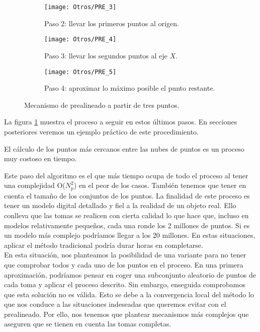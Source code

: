\begin{figure}[h!]
	\begin{subfigure}{0.5\textwidth}
		\centering
		\texttt{[image: Otros/PRE\_3]}
		\caption{Paso 2: llevar los primeros puntos al origen.}
	\end{subfigure}
	\begin{subfigure}{0.5\textwidth}
		\centering
		\texttt{[image: Otros/PRE\_4]}
		\caption{Paso 3: llevar los segundos puntos al eje $ X $.}
	\end{subfigure}
	\begin{center}
		\begin{subfigure}{0.5\textwidth}
			\texttt{[image: Otros/PRE\_5]}
			\caption{Paso 4: aproximar lo máximo posible el punto restante.}
		\end{subfigure}
	\end{center}		
	\caption{Mecanismo de prealineado a partir de tres puntos.}
	\label{fig:ex-pre2}
\end{figure}


La figura \ref{fig:ex-pre2} muestra el proceso a seguir en estos últimos pasos. En secciones posteriores veremos un ejemplo práctico de este procedimiento.

\bigskip 
\begin{observacion}\label{ObsTmp}
El cálculo de los puntos más cercanos entre las nubes de puntos es un proceso muy costoso en tiempo.
\end{observacion}
Este paso del algoritmo es el que más tiempo ocupa de todo el proceso al tener una complejidad O($ N_p^2 $) en el peor de los casos. También tenemos que tener en cuenta el tamaño de los conjuntos de los puntos. La finalidad de este proceso es tener un modelo digital detallado y fiel a la realidad de un objeto real. Ello conlleva que las tomas se realicen con cierta calidad lo que hace que, incluso en modelos relativamente pequeños, cada una ronde los 2 millones de puntos. Si es un modelo más complejo podríamos llegar a los 20 millones. En estas situaciones, aplicar el método tradicional podría durar horas en completarse. \\

En esta situación, nos planteamos la posibilidad de una variante para no tener que comprobar todos y cada uno de los puntos en el proceso. En una primera aproximación, podríamos pensar en coger una subconjunto aleatorio de puntos de cada toma y aplicar el proceso descrito. Sin embargo, enseguida comprobamos que esta solución no es válida. Esto se debe a la convergencia local del método lo que nos conduce a las situaciones indeseadas que queremos evitar con el prealineado. Por ello, nos tenemos que plantear mecanismos más complejos que aseguren que se tienen en cuenta las tomas completas. \\

